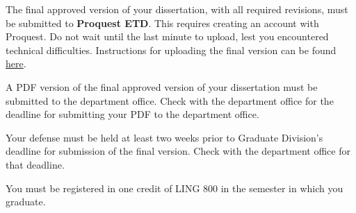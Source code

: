 \documentclass[
]{book}
\begin{document}
The final approved version of your dissertation, with all required revisions, must be submitted to \textbf{Proquest ETD}. This requires creating an account with Proquest. Do not wait until the last minute to upload, lest you encountered technical difficulties. Instructions for uploading the final version can be found \href{https://manoa.hawaii.edu/graduate/proquest-etd-submission-publication/}{here}.

A PDF version of the final approved version of your dissertation must be submitted to the department office. Check with the department office for the deadline for submitting your PDF to the department office.

Your defense must be held at least two weeks prior to Graduate Division's deadline for submission of the final version. Check with the department office for that deadline.

You must be registered in one credit of LING 800 in the semester in which you graduate.


\end{document}
